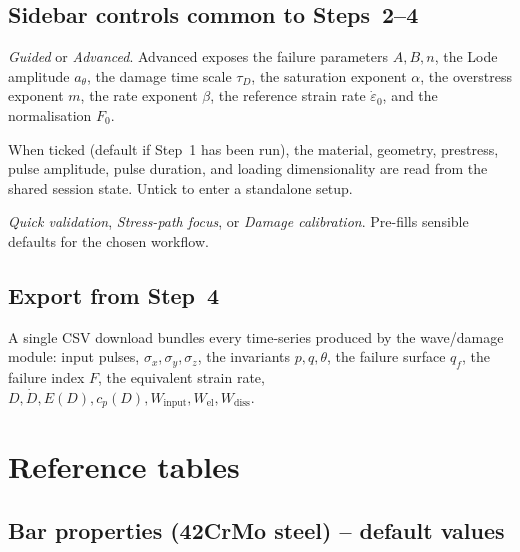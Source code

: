 \documentclass[11pt,a4paper,openany]{book}
\theoremstyle{handbook}
\newcommand{\sig}{\sigma}
\newcommand{\eps}{\varepsilon}
\newcommand{\epsdot}{\dot\eps}
\begin{document}
\section{Sidebar controls common to Steps~2--4}

\begin{description}[leftmargin=2em,style=nextline]
  \item[Control level] \emph{Guided} or \emph{Advanced}. Advanced exposes
    the failure parameters $A,B,n$, the Lode amplitude $a_\theta$, the
    damage time scale $\tau_D$, the saturation exponent $\alpha$, the
    overstress exponent $m$, the rate exponent $\beta$, the reference
    strain rate $\epsdot_0$, and the normalisation $F_0$.
  \item[Use Step 1 setup] When ticked (default if Step~1 has been run),
    the material, geometry, prestress, pulse amplitude, pulse duration,
    and loading dimensionality are read from the shared session state.
    Untick to enter a standalone setup.
  \item[Analysis goal] \emph{Quick validation}, \emph{Stress-path focus},
    or \emph{Damage calibration}. Pre-fills sensible defaults for the
    chosen workflow.
\end{description}

\section{Export from Step~4}

A single CSV download bundles every time-series produced by the
wave/damage module: input pulses, $\sig_x,\sig_y,\sig_z$, the invariants
$p,q,\theta$, the failure surface $q_f$, the failure index $F$, the
equivalent strain rate, $D,\dot D,E(D),c_p(D),W_{\text{input}},
W_{\text{el}},W_{\text{diss}}$.


\appendix

\chapter{Reference tables}\label{app:tables}

\section{Bar properties (42CrMo steel) -- default values}
\end{document}

